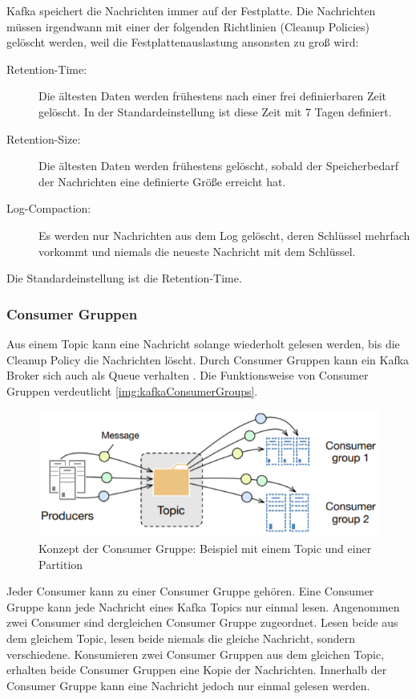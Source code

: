 \documentclass[a4paper,titlepage,halfparskip,12pt]{scrreprt}
\begin{document}
\begin{onehalfspacing}
Kafka speichert die Nachrichten immer auf der Festplatte. Die Nachrichten müssen irgendwann mit einer der folgenden Richtlinien (Cleanup Policies) \cite{berleKafkaOverview} gelöscht werden, weil die Festplattenauslastung ansonsten zu groß wird:

\begin{description}
\item[Retention-Time:] Die ältesten Daten werden frühestens nach einer frei definierbaren Zeit gelöscht. In der Standardeinstellung ist diese Zeit mit 7 Tagen definiert.
\item[Retention-Size:] Die ältesten Daten werden frühestens gelöscht, sobald der Speicherbedarf der Nachrichten eine definierte Größe erreicht hat.
\item[Log-Compaction:] Es werden nur Nachrichten aus dem Log gelöscht, deren Schlüssel mehrfach vorkommt und niemals die neueste Nachricht mit dem Schlüssel.
\end{description}

Die Standardeinstellung ist die Retention-Time.

\subsubsection*{Consumer Gruppen}

Aus einem Topic kann eine Nachricht solange wiederholt gelesen werden, bis die Cleanup Policy die Nachrichten löscht. Durch Consumer Gruppen kann ein Kafka Broker sich auch als Queue verhalten \cite{nannoniDissKafka}. Die Funktionsweise von Consumer Gruppen verdeutlicht \autoref{img:kafkaConsumerGroups}.

\begin{figure}[h]
	\centering
	\includegraphics[width=.8\textwidth]{images/kafkaConsumerGroups}
	\caption{Konzept der Consumer Gruppe: Beispiel mit einem Topic und einer Partition \cite{nannoniDissKafka}}
	\label{img:kafkaConsumerGroups}
\end{figure}

Jeder Consumer kann zu einer Consumer Gruppe gehören. Eine Consumer Gruppe kann jede Nachricht eines Kafka Topics nur einmal lesen. Angenommen zwei Consumer sind dergleichen Consumer Gruppe zugeordnet. Lesen beide aus dem gleichem Topic, lesen beide niemals die gleiche Nachricht, sondern verschiedene. Konsumieren zwei Consumer Gruppen aus dem gleichen Topic, erhalten beide Consumer Gruppen eine Kopie der Nachrichten. Innerhalb der Consumer Gruppe kann eine Nachricht jedoch nur einmal gelesen werden.\cite{berleKafkaOverview, nannoniDissKafka}


\end{onehalfspacing}
\end{document}
